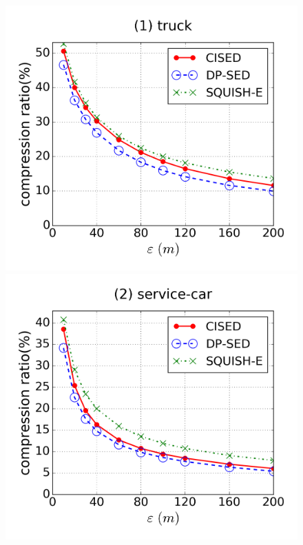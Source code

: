 \begin{figure}[tb!]
\centering
\includegraphics[scale = 0.24]{figures/Exp-cr-epsilon-truck.png}
\includegraphics[scale = 0.24]{figures/Exp-cr-epsilon-service.png}

\end{figure}
